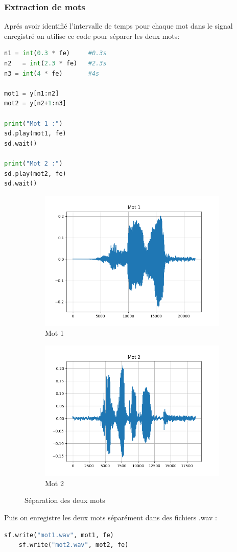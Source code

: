 \subsubsection{Extraction de mots}

Aprés avoir identifié l'intervalle de temps pour chaque mot dans le signal enregistré on utilise ce code pour séparer les deux mots:
\begin{lstlisting}[language=python]
n1 = int(0.3 * fe)     #0.3s 
n2   = int(2.3 * fe)   #2.3s 
n3 = int(4 * fe)       #4s 

mot1 = y[n1:n2]
mot2 = y[n2+1:n3]

print("Mot 1 :")
sd.play(mot1, fe)
sd.wait()

print("Mot 2 :")
sd.play(mot2, fe)
sd.wait()
\end{lstlisting}

\begin{figure}[h]
    \centering
    \begin{subfigure}[b]{0.45\textwidth}
        \centering
        \includegraphics[width=9cm]{screenshots/mot1_graphe.png}
        \caption{Mot 1}
        \label{fig:mot1}
    \end{subfigure}
    \hfill
    \begin{subfigure}[b]{0.45\textwidth}
        \centering
        \includegraphics[width=9cm]{screenshots/mot2_graphe.png}
        \caption{Mot 2}
        \label{fig:mot2}
    \end{subfigure}
    \caption{Séparation des deux mots}
    \label{fig:Séparation des deux mots}
\end{figure}

Puis on enregistre les deux mots séparément dans des fichiers .wav :
\begin{lstlisting}[language=python]
    sf.write("mot1.wav", mot1, fe)
    sf.write("mot2.wav", mot2, fe)
\end{lstlisting}